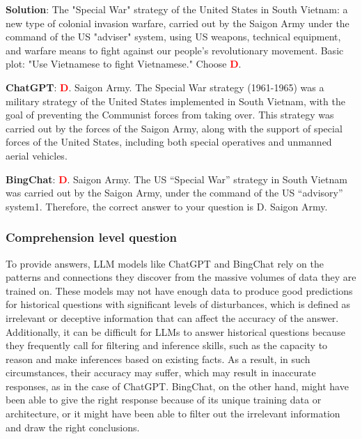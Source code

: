 \documentclass{article}
\begin{document}
{\begin{mdframed}[linewidth=1pt,linecolor=red]
		\textbf{Solution}: The "Special War" strategy of the United States in South Vietnam: a new type of colonial invasion warfare, carried out by the Saigon Army under the command of the US "adviser" system, using US weapons, technical equipment, and warfare means to fight against our people's revolutionary movement. Basic plot: "Use Vietnamese to fight Vietnamese."
		Choose \textcolor{red}{\textbf{D}}.
		
		\textbf{ChatGPT}: \textcolor{red}{\textbf{D}}. Saigon Army. The Special War strategy (1961-1965) was a military strategy of the United States implemented in South Vietnam, with the goal of preventing the Communist forces from taking over. This strategy was carried out by the forces of the Saigon Army, along with the support of special forces of the United States, including both special operatives and unmanned aerial vehicles.
		
		\textbf{BingChat}: \textcolor{red}{\textbf{D}}. Saigon Army. The US “Special War” strategy in South Vietnam was carried out by the Saigon Army, under the command of the US “advisory” system1. Therefore, the correct answer to your question is D. Saigon Army.
		
	\end{mdframed}	
	
	\subsubsection{Comprehension level question}
	\label{VNHSGE_His_C}
	
	To provide answers, LLM models like ChatGPT and BingChat rely on the patterns and connections they discover from the massive volumes of data they are trained on. These models may not have enough data to produce good predictions for historical questions with significant levels of disturbances, which is defined as irrelevant or deceptive information that can affect the accuracy of the answer. Additionally, it can be difficult for LLMs to answer historical questions because they frequently call for filtering and inference skills, such as the capacity to reason and make inferences based on existing facts. As a result, in such circumstances, their accuracy may suffer, which may result in inaccurate responses, as in the case of ChatGPT.  BingChat, on the other hand, might have been able to give the right response because of its unique training data or architecture, or it might have been able to filter out the irrelevant information and draw the right conclusions.
	
}
\end{document}

